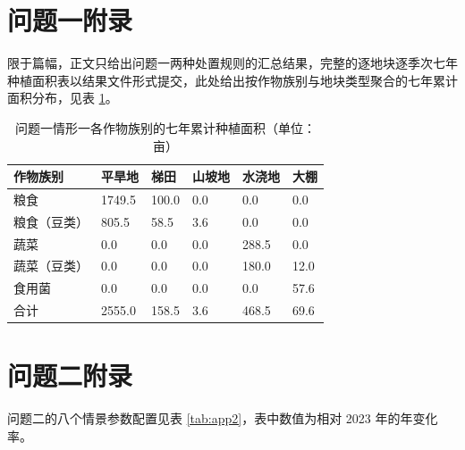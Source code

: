 \documentclass[bwprint]{gmcmthesis}
\begin{document}
\clearpage
\label{appendix:start}
\begin{appendices}

\section{问题一附录}

限于篇幅，正文只给出问题一两种处置规则的汇总结果，完整的逐地块逐季次七年种植面积表以结果文件形式提交，此处给出按作物族别与地块类型聚合的七年累计面积分布，见表 \ref{tab:app1}。

\begin{table}[htbp]
\centering
\renewcommand\arraystretch{1.2}
\begin{tabular}{|p{3.2cm}|p{2.2cm}|p{2.2cm}|p{2.2cm}|p{2.2cm}|p{2.2cm}|}
  \hline
  作物族别  &  平旱地  &  梯田  &  山坡地  &  水浇地  &  大棚 \\
  \hline
  粮食  &  1749.5  &  100.0  &  0.0  &  0.0  &  0.0 \\
  \hline
  粮食（豆类）  &  805.5  &  58.5  &  3.6  &  0.0  &  0.0 \\
  \hline
  蔬菜  &  0.0  &  0.0  &  0.0  &  288.5  &  0.0 \\
  \hline
  蔬菜（豆类）  &  0.0  &  0.0  &  0.0  &  180.0  &  12.0 \\
  \hline
  食用菌  &  0.0  &  0.0  &  0.0  &  0.0  &  57.6 \\
  \hline
  合计  &  2555.0  &  158.5  &  3.6  &  468.5  &  69.6 \\
  \hline
\end{tabular}
\caption{问题一情形一各作物族别的七年累计种植面积（单位：亩）}
\label{tab:app1}
\end{table}

\section{问题二附录}

问题二的八个情景参数配置见表 \ref{tab:app2}，表中数值为相对 2023 年的年变化率。


\end{appendices}
\end{document}
